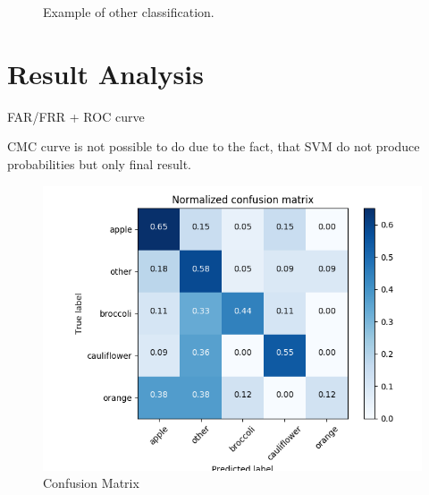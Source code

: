 \documentclass[a4paper, 11pt]{article}
\begin{document}
\begin{figure}[!htbp]
  \centering
  \hfill
  \hfill
  \caption{Example of other classification.}
\end{figure}



\section*{Result Analysis}

FAR/FRR + ROC curve

CMC curve is not possible to do due to the fact, that SVM do not produce probabilities but only final result.


\begin{figure}[!htbp]
\includegraphics[scale=1]{results/confusion_matrix.png}
\centering
\caption{Confusion Matrix}
\end{figure}
\end{document}
